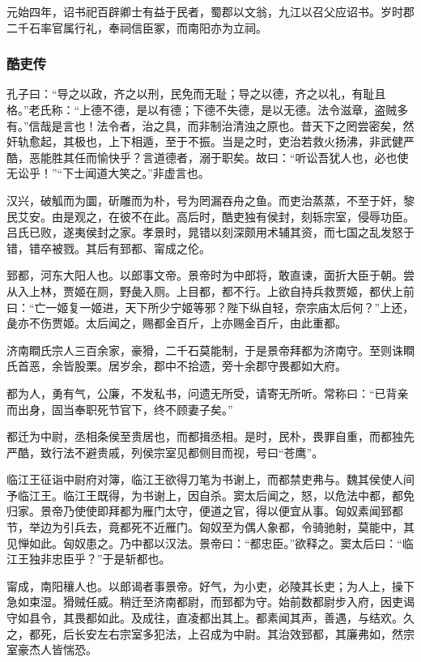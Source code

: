 \documentclass[]{article}
\begin{document}
元始四年，诏书祀百辟卿士有益于民者，蜀郡以文翁，九江以召父应诏书。岁时郡二千石率官属行礼，奉祠信臣冢，而南阳亦为立祠。

\hypertarget{header-n6012}{%
\subsubsection{酷吏传}\label{header-n6012}}

孔子曰：``导之以政，齐之以刑，民免而无耻；导之以德，齐之以礼，有耻且格。''老氏称：``上德不德，是以有德；下德不失德，是以无德。法令滋章，盗贼多有。''信哉是言也！法令者，治之具，而非制治清浊之原也。昔天下之罔尝密矣，然奸轨愈起，其极也，上下相遁，至于不振。当是之时，吏治若救火扬沸，非武健严酷，恶能胜其任而愉快乎？言道德者，溺于职矣。故曰：``听讼吾犹人也，必也使无讼乎！''``下士闻道大笑之。''非虚言也。

汉兴，破觚而为圜，斫雕而为朴，号为罔漏吞舟之鱼。而吏治蒸蒸，不至于奸，黎民艾安。由是观之，在彼不在此。高后时，酷吏独有侯封，刻轹宗室，侵辱功臣。吕氏已败，遂夷侯封之家。孝景时，晁错以刻深颇用术辅其资，而七国之乱发怒于错，错卒被戮。其后有郅都、甯成之伦。

郅都，河东大阳人也。以郎事文帝。景帝时为中郎将，敢直谏，面折大臣于朝。尝从入上林，贾姬在厕，野彘入厕。上目都，都不行。上欲自持兵救贾姬，都伏上前曰：``亡一姬复一姬进，天下所少宁姬等邪？陛下纵自轻，奈宗庙太后何？''上还，彘亦不伤贾姬。太后闻之，赐都金百斤，上亦赐金百斤，由此重都。

济南瞷氏宗人三百余家，豪猾，二千石莫能制，于是景帝拜都为济南守。至则诛瞷氏首恶，余皆股栗。居岁余，郡中不拾遗，旁十余郡守畏都如大府。

都为人，勇有气，公廉，不发私书，问遗无所受，请寄无所听。常称曰：``已背亲而出身，固当奉职死节官下，终不顾妻子矣。''

都迁为中尉，丞相条侯至贵居也，而都揖丞相。是时，民朴，畏罪自重，而都独先严酷，致行法不避贵戚，列侯宗室见都侧目而视，号曰``苍鹰''。

临江王征诣中尉府对簿，临江王欲得刀笔为书谢上，而都禁吏弗与。魏其侯使人间予临江王。临江王既得，为书谢上，因自杀。窦太后闻之，怒，以危法中都，都免归家。景帝乃使使即拜都为雁门太守，便道之官，得以便宜从事。匈奴素闻郅都节，举边为引兵去，竟都死不近雁门。匈奴至为偶人象都，令骑驰射，莫能中，其见惮如此。匈奴患之。乃中都以汉法。景帝曰：``都忠臣。''欲释之。窦太后曰：``临江王独非忠臣乎？''于是斩都也。

甯成，南阳穰人也。以郎谒者事景帝。好气，为小吏，必陵其长吏；为人上，操下急如束湿。猾贼任威。稍迁至济南都尉，而郅都为守。始前数都尉步入府，因吏谒守如县令，其畏都如此。及成往，直凌都出其上。都素闻其声，善遇，与结欢。久之，都死，后长安左右宗室多犯法，上召成为中尉。其治效郅都，其廉弗如，然宗室豪杰人皆惴恐。
\end{document}
